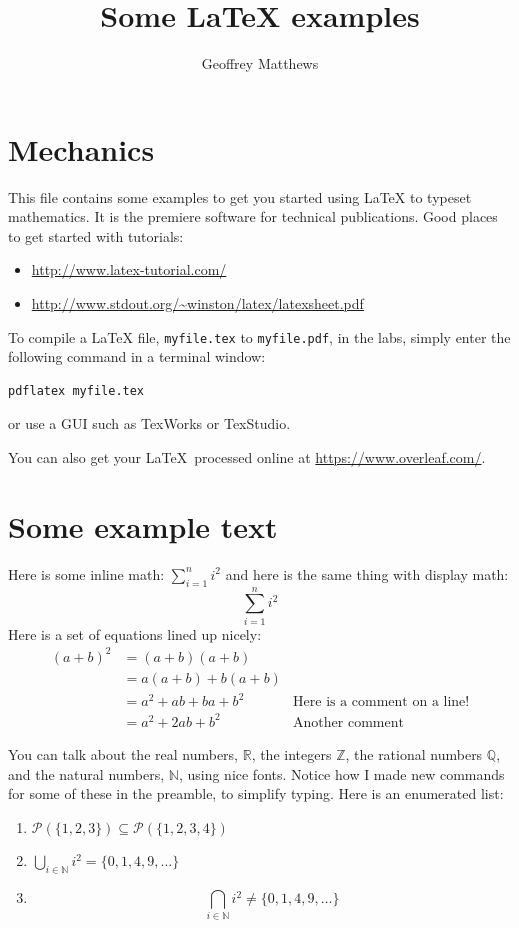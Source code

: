 \documentclass{article}
\title{Some \LaTeX{} examples}
\author{Geoffrey Matthews}
\newcommand{\R}{\mathbb{R}}
\newcommand{\N}{\mathbb{N}}
\begin{document}
\maketitle

\section{Mechanics}
This file contains some examples to get you started using \LaTeX{} to
typeset mathematics.  It is the premiere software for technical
publications.  Good places to get started with tutorials: 
\begin{itemize}
\item \url{http://www.latex-tutorial.com/}
\item \url{http://www.stdout.org/~winston/latex/latexsheet.pdf}
\end{itemize}

To compile a \LaTeX{} file, {\tt myfile.tex} to {\tt myfile.pdf}, 
in the labs, simply enter the
following command in a terminal window:
\begin{Verbatim}[frame=single]
pdflatex myfile.tex
\end{Verbatim}
or use a GUI such as TexWorks or TexStudio.

You can also get your \LaTeX\ processed online at
\url{https://www.overleaf.com/}.

\section{Some example text}
Here is some inline math:  $\sum_{i=1}^{n} i^2$ and
here is the same thing with display math:
\[
\sum_{i=1}^{n} i^2
\]
Here is a set of equations lined up nicely:
\begin{align*}
(a+b)^2 &= (a+b)(a+b) \\
        &= a(a+b) + b(a+b) \\
        &= a^2 + ab + ba + b^2  & \mbox{Here is a comment on a line!}\\
        &= a^2 + 2ab + b^2      & \mbox{Another comment}
\end{align*}

You can talk about the real numbers, $\R$, the integers $\mathbb{Z}$, the
rational numbers $\mathbb{Q}$, and the natural numbers,
$\N$, using nice fonts.  Notice how I made new commands for some of these in
the preamble, to simplify typing.
Here is an enumerated list:
\begin{enumerate}

\item $\mathcal{P}(\{1,2,3\}) \subseteq \mathcal{P}(\{1,2,3,4\})$

\item
$
\bigcup_{i\in\N}i^2 = \{0,1,4,9,\ldots\}
$

\item
\[
\bigcap_{i\in\N}i^2 \not= \{0,1,4,9,\ldots\}
\]

\end{enumerate}
\end{document}
